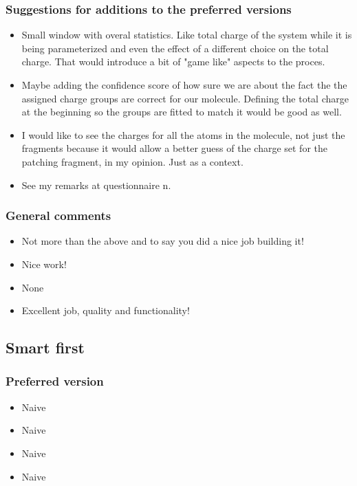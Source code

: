 \subsubsection{Suggestions for additions to the preferred versions}
\begin{itemize}
\item Small window with overal statistics. Like total charge of the system while it is being parameterized and even the effect of a different choice on the total charge. That would introduce a bit of "game like" aspects to the proces. 

\item Maybe adding the confidence score of how sure we are about the fact the the assigned charge groups are correct for our molecule. Defining the total charge at the beginning so the groups are fitted to match it would be good as well.

\item I would like to see the charges for all the atoms in the molecule, not just the fragments because it would allow a better guess of the charge set for the patching fragment, in my opinion. Just as a context. 

\item See my remarks at questionnaire n.

\end{itemize}


\subsubsection{General comments}
\begin{itemize}
\item Not more than the above and to say you did a nice job building it!

\item Nice work!

\item None

\item Excellent job, quality and functionality!

\end{itemize}


\subsection{Smart first}
\subsubsection{Preferred version}
\begin{itemize}
\item Naive

\item Naive

\item Naive

\item Naive

\end{itemize}


